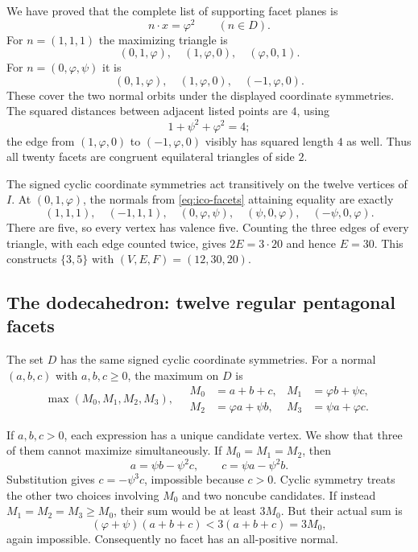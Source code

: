 We have proved that the complete list of supporting facet planes is
\begin{equation}\label{eq:ico-facets}
 n\cdot x=\varphi^2\qquad(n\in D).
\end{equation}
For $n=(1,1,1)$ the maximizing triangle is
\[
 (0,1,\varphi),\quad (1,\varphi,0),\quad (\varphi,0,1).
\]
For $n=(0,\varphi,\psi)$ it is
\[
 (0,1,\varphi),\quad (1,\varphi,0),\quad (-1,\varphi,0).
\]
These cover the two normal orbits under the displayed coordinate
symmetries.  The squared distances between adjacent listed points are
$4$, using
\[
 1+\psi^2+\varphi^2=4;
\]
the edge from $(1,\varphi,0)$ to $(-1,\varphi,0)$ visibly has squared
length $4$ as well.  Thus all twenty facets are congruent equilateral
triangles of side $2$.

The signed cyclic coordinate symmetries act transitively on the twelve
vertices of $I$.  At $(0,1,\varphi)$, the normals from
\eqref{eq:ico-facets} attaining equality are exactly
\[
 (1,1,1),\quad(-1,1,1),\quad(0,\varphi,\psi),\quad
 (\psi,0,\varphi),\quad(-\psi,0,\varphi).
\]
There are five, so every vertex has valence five.
Counting the three edges of every triangle, with each edge counted
twice, gives $2E=3\cdot20$ and hence $E=30$.
This constructs $\{3,5\}$ with $(V,E,F)=(12,30,20)$.

\subsection{The dodecahedron: twelve regular pentagonal facets}

The set $D$ has the same signed cyclic coordinate symmetries.
For a normal $(a,b,c)$ with $a,b,c\ge0$, the maximum on $D$ is
\begin{equation}\label{eq:dodeca-maxima}
 \max(M_0,M_1,M_2,M_3),
 \quad
 \begin{aligned}
 M_0&=a+b+c, & M_1&=\varphi b+\psi c,\\
 M_2&=\varphi a+\psi b, & M_3&=\psi a+\varphi c.
 \end{aligned}
\end{equation}

If $a,b,c>0$, each expression has a unique candidate vertex.
We show that three of them cannot maximize simultaneously.
If $M_0=M_1=M_2$, then
\[
 a=\psi b-\psi^2 c,
 \qquad c=\psi a-\psi^2 b.
\]
Substitution gives $c=-\psi^3c$, impossible because $c>0$.
Cyclic symmetry treats the other two choices involving $M_0$ and two
noncube candidates.  If instead $M_1=M_2=M_3\ge M_0$, their sum would
be at least $3M_0$.  But their actual sum is
\[
 (\varphi+\psi)(a+b+c)<3(a+b+c)=3M_0,
\]
again impossible.  Consequently no facet has an all-positive normal.


